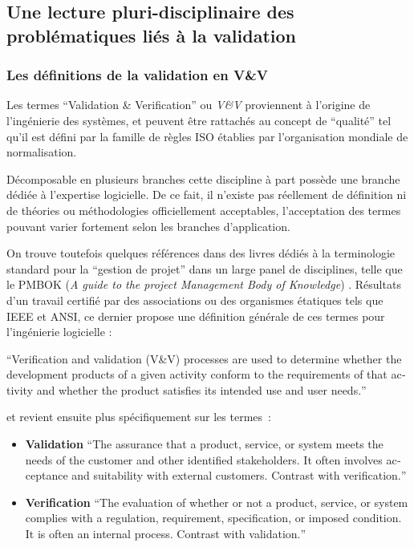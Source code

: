 

\subsection{Une lecture pluri-disciplinaire des problématiques liés à la validation}
\label{ssec:triple_lecture}


\subsubsection{Les définitions de la validation en V\&V}
\label{sssec:def_generique_validation}

Les termes \foreignquote{english}{Validation \& Verification} ou \textit{V\&V} proviennent à l'origine de l'ingénierie des systèmes, et peuvent être rattachés au concept de \enquote{qualité} tel qu'il est défini par la famille de règles ISO établies par l'organisation mondiale de normalisation.

Décomposable en plusieurs branches cette discipline à part possède une branche dédiée à l'expertise logicielle. De ce fait, il n'existe pas réellement de définition ni de théories ou méthodologies officiellement acceptables, l'acceptation des termes pouvant varier fortement selon les branches d'application.

On trouve toutefois quelques références dans des livres dédiés à la terminologie standard pour la \enquote{gestion de projet} dans un large panel de disciplines, telle que le PMBOK (\textit{A guide to the project Management Body of Knowledge}) \autocite{PMBOK2013}. Résultats d'un travail certifié par des associations ou des organismes étatiques tels que IEEE et ANSI, ce dernier propose une définition générale de ces termes pour l'ingénierie logicielle :

\foreignquote{english}{Verification and validation (V\&V) processes are used to determine whether the development products of a given activity conform to the requirements of that activity and whether the product satisfies its intended use and user needs.}

et revient ensuite plus spécifiquement sur les termes :

\begin{itemize}
\item \textbf{Validation} \foreignquote{english}{The assurance that a product, service, or system meets the needs of the customer and other identified stakeholders. It often involves acceptance and suitability with external customers. Contrast with verification.}
\item \textbf{Verification} \foreignquote{english}{The evaluation of whether or not a product, service, or system complies with a regulation, requirement, specification, or imposed condition. It is often an internal process. Contrast with validation.}
\end{itemize}

